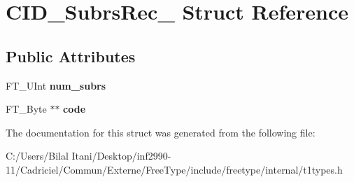 \hypertarget{struct_c_i_d___subrs_rec__}{}\section{C\+I\+D\+\_\+\+Subrs\+Rec\+\_\+ Struct Reference}
\label{struct_c_i_d___subrs_rec__}
\subsection*{Public Attributes}
\begin{DoxyCompactItemize}
\item 
F\+T\+\_\+\+U\+Int {\bfseries num\+\_\+subrs}\hypertarget{struct_c_i_d___subrs_rec___a3abd23388e2e0f4888f826a993953c7e}{}\label{struct_c_i_d___subrs_rec___a3abd23388e2e0f4888f826a993953c7e}

\item 
F\+T\+\_\+\+Byte $\ast$$\ast$ {\bfseries code}\hypertarget{struct_c_i_d___subrs_rec___a1a4f0a4e514492fccaf81d7ede6c4e08}{}\label{struct_c_i_d___subrs_rec___a1a4f0a4e514492fccaf81d7ede6c4e08}

\end{DoxyCompactItemize}


The documentation for this struct was generated from the following file\+:\begin{DoxyCompactItemize}
\item 
C\+:/\+Users/\+Bilal Itani/\+Desktop/inf2990-\/11/\+Cadriciel/\+Commun/\+Externe/\+Free\+Type/include/freetype/internal/t1types.\+h\end{DoxyCompactItemize}
